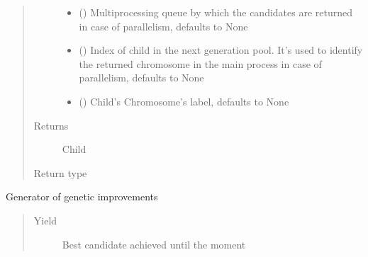 \documentclass[letterpaper,10pt,english]{sphinxmanual}
\begin{document}
\begin{fulllineitems}
\begin{fulllineitems}
\begin{quote}
\begin{description}
\begin{itemize}
\item {} 
\sphinxAtStartPar
{} (\sphinxstyleliteralemphasis{\sphinxupquote{, }}) \textendash{} Multiprocessing queue by which the candidates are returned in case of parallelism, defaults to 
None

\item {} 
\sphinxAtStartPar
{} (\sphinxstyleliteralemphasis{\sphinxupquote{, }}) \textendash{} Index of child in the next generation pool. It’s used to identify the returned chromosome in
the main process in case of parallelism, defaults to None

\item {} 
\sphinxAtStartPar
{} (\sphinxstyleliteralemphasis{\sphinxupquote{, }}) \textendash{} Child’s Chromosome’s label, defaults to None

\end{itemize}

\item[{Returns}] \leavevmode
\sphinxAtStartPar
Child

\item[{Return type}] \leavevmode
\sphinxAtStartPar
{\hyperref[\detokenize{MolOpt.genetic:MolOpt.genetic.genetic.Chromosome}]{}}

\end{description}\end{quote}

\end{fulllineitems}


\begin{fulllineitems}
\label{\detokenize{MolOpt.genetic:MolOpt.genetic.genetic.Genetic.__get_improvement}}
\sphinxAtStartPar
Generator of genetic improvements
\begin{quote}\begin{description}
\item[{Yield}] \leavevmode
\sphinxAtStartPar
Best candidate achieved until the moment


\end{description}
\end{quote}
\end{fulllineitems}
\end{fulllineitems}
\end{document}
